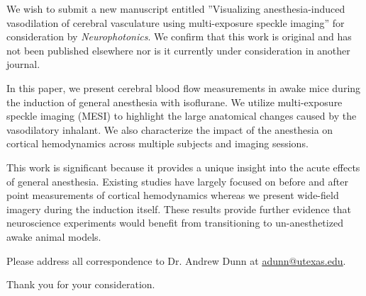 \documentclass[12pt,stdletter,orderfromtodate,dateleft,sigleft]{newlfm}
\begin{document}
\begin{newlfm}

We wish to submit a new manuscript entitled ''Visualizing anesthesia-induced vasodilation of cerebral vasculature using multi-exposure speckle imaging'' for consideration by \emph{Neurophotonics}. We confirm that this work is original and has not been published elsewhere nor is it currently under consideration in another journal.

In this paper, we present cerebral blood flow measurements in awake mice during the induction of general anesthesia with isoflurane. We utilize multi-exposure speckle imaging (MESI) to highlight the large anatomical changes caused by the vasodilatory inhalant. We also characterize the impact of the anesthesia on cortical hemodynamics across multiple subjects and imaging sessions.

This work is significant because it provides a unique insight into the acute effects of general anesthesia. Existing studies have largely focused on before and after point measurements of cortical hemodynamics whereas we present wide-field imagery during the induction itself. These results provide further evidence that neuroscience experiments would benefit from transitioning to un-anesthetized awake animal models.

Please address all correspondence to Dr. Andrew Dunn at \href{mailto:adunn@utexas.edu}{\underline{adunn@utexas.edu}}.

Thank you for your consideration.

\end{newlfm}
\end{document}
